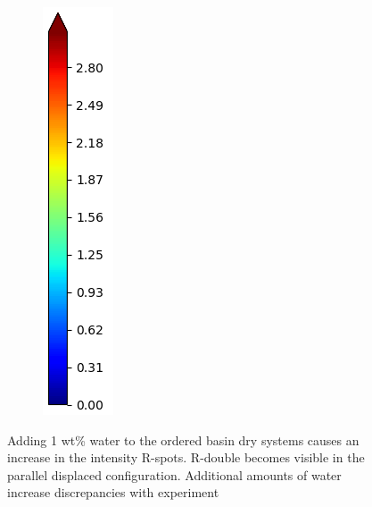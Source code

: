 \documentclass{article}
\begin{document}
\begin{figure}[!htb]
\begin{subfigure}{0.075\textwidth}
  	\includegraphics[width=\textwidth]{colorbar_jet.png}
  \end{subfigure}
	\caption{Adding 1 wt\% water to the ordered basin dry systems causes an increase in the intensity
	R-spots. R-double becomes visible in the parallel displaced configuration. Additional amounts
	of water increase discrepancies with experiment} %
  \label{fig:solvation}

  \end{figure}
  
\end{document}
